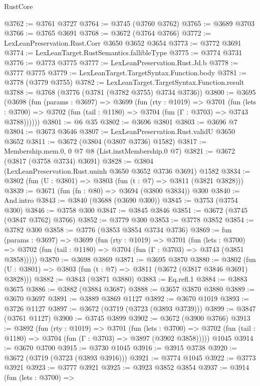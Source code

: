 \begin{lexlean}{RustCore}
\begin{coremodule}
@3762 := @3761 @3727
@3764 := @3745 (@3760 @3762)
@3765 := @3689 @3703
@3766 := @3765 @3691
@3768 := @3672 (@3764 @3766)
@3772 := LexLeanPreservation.Rust.Corr @3650 @3652 @3654
@3773 := @3772 @3691
@3774 := LexLeanTarget.RustSemantics.fallibleType
@3775 := @3774 @3731
@3776 := @3773 @3775
@3777 := LexLeanPreservation.Rust.Jd.b
@3778 := @3777 @3775
@3779 := LexLeanTarget.TargetSyntax.Function.body
@3781 := @3778 (@3779 @3755)
@3782 := LexLeanTarget.TargetSyntax.Function.result
@3788 := @3768 (@3776 (@3781 (@3782 @3755) @3734 @3736))
@3800 := @3695
    (@3698
      (fun (params : @3697) =>
      @3699
        (fun (rty : @1019) =>
        @3701
          (fun (lets : @3700) =>
          @3702 (fun (tail : @1180) => @3704 (fun (Γ : @3703) => @3743 @3788))))))
@3801 := @6 @35
@3802 := @3696 @3801
@3803 := @3696 @7
@3804 := @3673 @3646
@3807 := LexLeanPreservation.Rust.validU @3650 @3652
@3811 := @3672 (@3804 (@3807 @3736) @1582)
@3817 := Membership.mem.{0, 0} @7 @8 (List.instMembership.{0} @7)
@3821 := @3672 (@3817 (@3758 @3734) @3691)
@3828 := @3804 (LexLeanPreservation.Rust.uninh @3650 @3652 @3736 @3691) @1582
@3834 := @3802 (fun (U : @3801) => @3803 (fun (t : @7) => @3811 (@3821 @3828)))
@3839 := @3671 (fun (fn : @80) => @3694 (@3800 @3834)) @300
@3840 := And.intro
@3843 := @3840 (@3688 (@3690 @300))
@3845 := @3753 (@3754 @300)
@3846 := @3758 @300
@3847 := @3845 @3846
@3851 := @3672 (@3745 (@3847 @3762) @3766)
@3852 := @3779 @300
@3853 := @3778 @3852
@3854 := @3782 @300
@3858 := @3776 (@3853 @3854 @3734 @3736)
@3869 := fun (params : @3697) =>
  @3699
    (fun (rty : @1019) =>
    @3701
      (fun (lets : @3700) =>
      @3702 (fun (tail : @1180) => @3704 (fun (Γ : @3703) => @3743 (@3851 @3858)))))
@3870 := @3698 @3869
@3871 := @3695 @3870
@3880 := @3802 (fun (U : @3801) => @3803 (fun (t : @7) => @3811 (@3672 (@3817 @3846 @3691) @3828)))
@3882 := @3843 (@3871 @3880)
@3883 := Eq.refl.{1}
@3884 := @3883 @3675
@3886 := @3882 (@3884 @3687)
@3888 := @3657 @3870 @3880
@3889 := @3670 @3697
@3891 := @3889 @3869 @1127
@3892 := @3670 @1019
@3893 := @3726 @1127
@3897 := @3672 (@3719 (@3723 (@3893 @3739)))
@3899 := @3847 (@3761 @1127)
@3900 := @3745 @3899
@3902 := @3672 (@3900 @3766)
@3913 := @3892
    (fun (rty : @1019) =>
    @3701
      (fun (lets : @3700) =>
      @3702 (fun (tail : @1180) => @3704 (fun (Γ : @3703) => @3897 (@3902 @3858)))))
    @1045
@3914 := @3670 @3700
@3915 := @3730 @1045
@3916 := @3915 @3738
@3920 := @3672 (@3719 (@3723 (@3893 @3916)))
@3921 := @3774 @1045
@3922 := @3773 @3921
@3923 := @3777 @3921
@3925 := @3923 @3852 @3854
@3937 := @3914
    (fun (lets : @3700) =>

\end{coremodule}
\end{lexlean}
